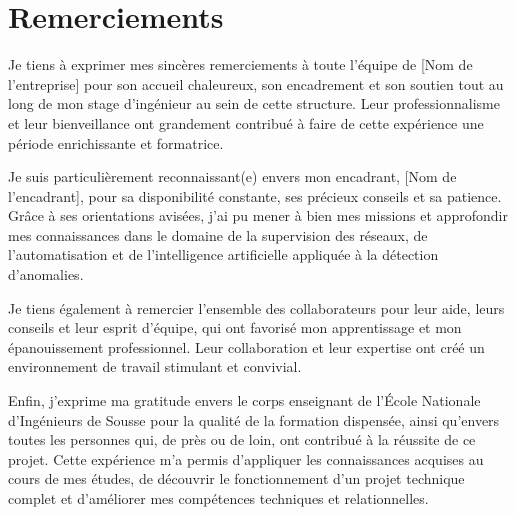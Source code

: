 \documentclass[12pt,a4paper]{report}
\begin{document}
\chapter*{Remerciements}

Je tiens à exprimer mes sincères remerciements à toute l'équipe de
[Nom de l'entreprise] pour son accueil chaleureux, son encadrement et son
soutien tout au long de mon stage d'ingénieur au sein de cette structure.
Leur professionnalisme et leur bienveillance ont grandement contribué à faire
de cette expérience une période enrichissante et formatrice.

Je suis particulièrement reconnaissant(e) envers mon encadrant,
[Nom de l'encadrant], pour sa disponibilité constante, ses précieux conseils et
sa patience. Grâce à ses orientations avisées, j'ai pu mener à bien mes missions
et approfondir mes connaissances dans le domaine de la supervision des réseaux,
de l'automatisation et de l'intelligence artificielle appliquée à la détection
d'anomalies.

Je tiens également à remercier l'ensemble des collaborateurs pour leur aide,
leurs conseils et leur esprit d'équipe, qui ont favorisé mon apprentissage et
mon épanouissement professionnel. Leur collaboration et leur expertise ont créé
un environnement de travail stimulant et convivial.

Enfin, j'exprime ma gratitude envers le corps enseignant de l'École Nationale
d'Ingénieurs de Sousse pour la qualité de la formation dispensée, ainsi qu'envers
toutes les personnes qui, de près ou de loin, ont contribué à la réussite de ce
projet. Cette expérience m'a permis d'appliquer les connaissances acquises au
cours de mes études, de découvrir le fonctionnement d'un projet technique complet
et d'améliorer mes compétences techniques et relationnelles.

\renewcommand{\contentsname}{Sommaire}
\tableofcontents
\thispagestyle{fancy}

\renewcommand{\listfigurename}{Liste des figures}
\listoffigures
{}
\end{document}

